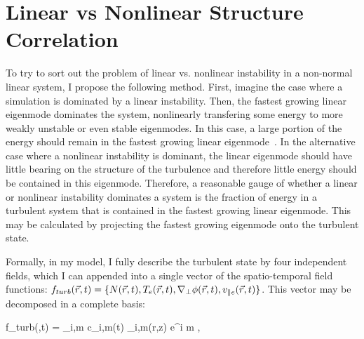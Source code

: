 \section{Linear vs Nonlinear Structure Correlation}
\label{s_lin_vs_nlin_struc}

To try to sort out the problem of linear vs. nonlinear instability in a non-normal linear system, I propose the following method.
First, imagine the case where a simulation is dominated by a linear instability. Then, the fastest growing linear
eigenmode dominates the system, nonlinearly transfering some energy to more weakly unstable or even stable eigenmodes. In this case, a large portion of the energy should remain in the fastest
growing linear eigenmode~\cite{hatch2011}. In the alternative case where a nonlinear instability is dominant, 
the linear eigenmode should have little bearing on the structure of the turbulence and therefore little
energy should be contained in this eigenmode. Therefore, a reasonable gauge of whether a linear or nonlinear instability dominates a system is the fraction of energy in a turbulent system
that is contained in the fastest growing linear eigenmode. This may be calculated by projecting the fastest growing eigenmode onto the turbulent state.

Formally, in my model, I fully describe the turbulent state by four independent fields, which I can appended into a single vector of the spatio-temporal field functions: 
$f_{turb}(\vec{r},t) = \{N(\vec{r},t),T_e(\vec{r},t),\nabla_\perp \phi(\vec{r},t), v_{\parallel e}(\vec{r},t)\}$. This vector may be decomposed in a complete basis:

\beq
\label{basis_decomp}
f_{turb}(,t) = \sum_{i,m} c_{i,m}(t) \psi_{i,m}(r,z) e^{i m \theta},
\eeq

